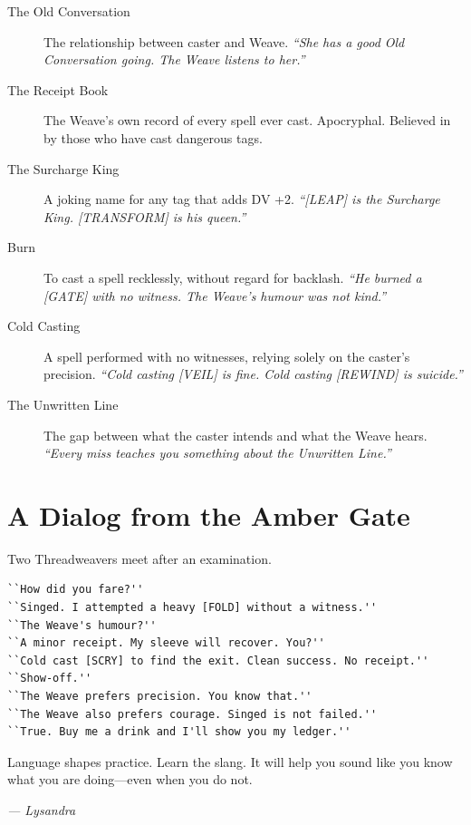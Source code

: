 \begin{description}
    \item[The Old Conversation] The relationship between caster and Weave. \emph{``She has a good Old Conversation going. The Weave listens to her.''}
    \item[The Receipt Book] The Weave's own record of every spell ever cast. Apocryphal. Believed in by those who have cast dangerous tags.
    \item[The Surcharge King] A joking name for any tag that adds DV +2. \emph{``[LEAP] is the Surcharge King. [TRANSFORM] is his queen.''}
    \item[Burn] To cast a spell recklessly, without regard for backlash. \emph{``He burned a [GATE] with no witness. The Weave's humour was not kind.''}
    \item[Cold Casting] A spell performed with no witnesses, relying solely on the caster's precision. \emph{``Cold casting [VEIL] is fine. Cold casting [REWIND] is suicide.''}
    \item[The Unwritten Line] The gap between what the caster intends and what the Weave hears. \emph{``Every miss teaches you something about the Unwritten Line.''}
\end{description}

\section{A Dialog from the Amber Gate}

Two Threadweavers meet after an examination.

\begin{verbatim}
``How did you fare?''
``Singed. I attempted a heavy [FOLD] without a witness.''
``The Weave's humour?''
``A minor receipt. My sleeve will recover. You?''
``Cold cast [SCRY] to find the exit. Clean success. No receipt.''
``Show-off.''
``The Weave prefers precision. You know that.''
``The Weave also prefers courage. Singed is not failed.''
``True. Buy me a drink and I'll show you my ledger.''
\end{verbatim}

\noindent
Language shapes practice. Learn the slang. It will help you sound like you know what you are doing---even when you do not.


\textit{--- Lysandra}
